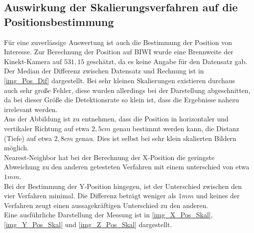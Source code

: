 \subsection{Auswirkung der Skalierungsverfahren auf die Positionsbestimmung}
Für eine zuverlässige Auswertung ist auch die Bestimmung der Position von Interesse. Zur Berechnung der Position auf BIWI wurde eine Brennweite der Kinekt-Kamera auf $531,15$ geschätzt, da es keine Angabe für den Datensatz gab.\\
Der Median der Differenz zwischen Datensatz und Rechnung ist in \autoref{img_Pos_Dif} dargestellt. Bei sehr kleinen Skalierungen existieren durchaus auch sehr große Fehler, diese wurden allerdings bei der Darstellung abgeschnitten, da bei dieser Größe die Detektionsrate so klein ist, dass die Ergebnisse nahezu irrelevant werden.\\
Aus der Abbildung ist zu entnehmen, dass die Position in horizontaler und vertikaler Richtung auf etwa $2,5cm$ genau bestimmt werden kann, die Distanz (Tiefe) auf etwa $2,8cm$ genau. Dies ist selbst bei sehr klein skalierten Bildern möglich.\\
Nearest-Neighbor hat bei der Berechnung der X-Position die geringste Abweichung zu den anderen getesteten Verfahren mit einem unterschied von etwa $1mm$.\\
Bei der Bestimmung der Y-Position hingegen, ist der Unterschied zwischen den vier Verfahren minimal. Die Differenz beträgt weniger als $1mm$ und keines der Verfahren zeugt einen aussagekräftigen Unterschied zu den anderen.\\
Eine ausführliche Darstellung der Messung ist in \autoref{img_X_Pos_Skal}, \autoref{img_Y_Pos_Skal} und \autoref{img_Z_Pos_Skal} dargestellt.
